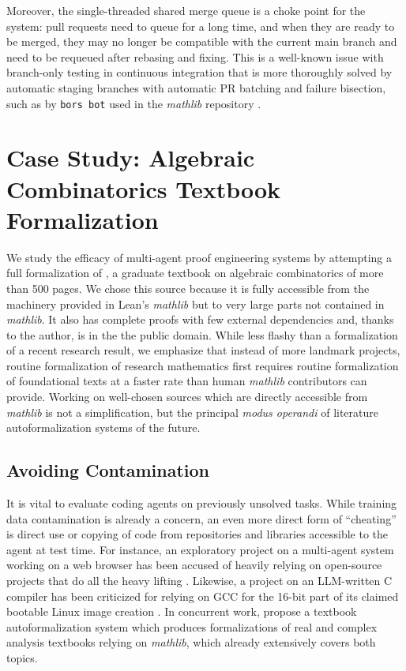 \documentclass[]{fairmeta}
\begin{document}
Moreover, the single-threaded shared merge queue is a choke point for the system: pull requests need to queue for a long time, and when they are ready to be merged, they may no longer be compatible with the current main branch and need to be requeued after rebasing and fixing. This is a well-known issue with branch-only testing in continuous integration that is more thoroughly solved by automatic staging branches with automatic PR batching and failure bisection, such as by \texttt{bors bot} used in the \emph{mathlib} repository \citep{chen2025growing}.

\section{Case Study: Algebraic Combinatorics Textbook Formalization}
We study the efficacy of multi-agent proof engineering systems by attempting a full formalization of \citet{grinberg2025introduction}, a graduate textbook on algebraic combinatorics of more than 500 pages. We chose this source because it is fully accessible from the machinery provided in Lean's \emph{mathlib} but to very large parts not contained in \emph{mathlib}. It also has complete proofs with few external dependencies and, thanks to the author, is in the the public domain. While less flashy than a formalization of a recent research result, we emphasize that instead of more landmark projects, routine formalization of research mathematics first requires routine formalization of foundational texts at a faster rate than human \emph{mathlib} contributors can provide. Working on well-chosen sources which are directly accessible from \emph{mathlib} is not a simplification, but the principal \emph{modus operandi} of literature autoformalization systems of the future.

\subsection{Avoiding Contamination}
It is vital to evaluate coding agents on previously unsolved tasks. While training data contamination is already a concern, an even more direct form of ``cheating'' is direct use or copying of code from repositories and libraries accessible to the agent at test time. For instance, an exploratory project on a multi-agent system working on a web browser \citep{Lin2026ScalingAgents} has been accused of heavily relying on open-source projects that do all the heavy lifting \citep{Gerard2026CursorLies}. Likewise, a project on an LLM-written C compiler \citep{Carlini2026BuildingCCompiler} has been criticized for relying on GCC for the 16-bit part of its claimed bootable Linux image creation \citep{VaughanNichols2026AnthropicCCompilerOpinion}. In concurrent work, \citet{wang2026m2fautomatedformalizationmathematical} propose a textbook autoformalization system which produces formalizations of real and complex analysis textbooks relying on \emph{mathlib}, which already extensively covers both topics.
\end{document}
